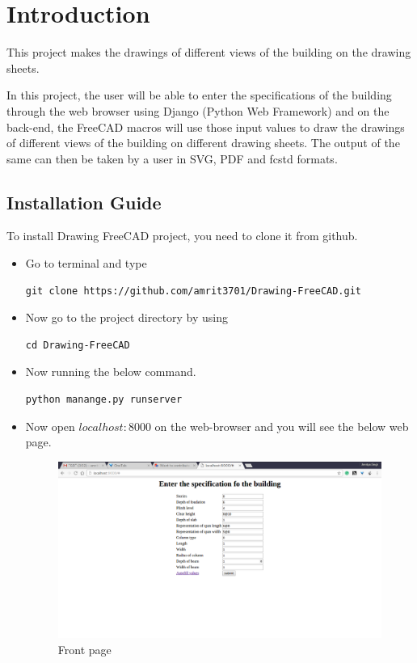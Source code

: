 \section{Introduction}
This project makes the drawings of different views of the building on the drawing sheets.

In this project, the user will be able to enter the specifications of the 
building through the web browser using Django (Python Web Framework) and 
on the back-end, the FreeCAD macros will use those input values to draw
the drawings of different views of the building on different drawing sheets. 
The output of the same can then be taken by a user in SVG, PDF and fcstd formats.
\subsection{Installation Guide}
To install Drawing FreeCAD project, you need to clone it from github.
\begin{itemize}
\item Go to terminal and type
\begin{lstlisting} 
git clone https://github.com/amrit3701/Drawing-FreeCAD.git
\end{lstlisting} 
\item Now go to the project directory by using
\begin{lstlisting} 
cd Drawing-FreeCAD
\end{lstlisting} 
\item Now running the below command.
\begin{lstlisting} 
python manange.py runserver
\end{lstlisting}
\item Now open $localhost:8000$ on the web-browser and you will see the below web page.
\begin{figure}[h!]
\begin{center}
\includegraphics[scale=0.35]{images/first_page.png}
\caption{Front page}
\end{center}
\end{figure}
\end{itemize}

